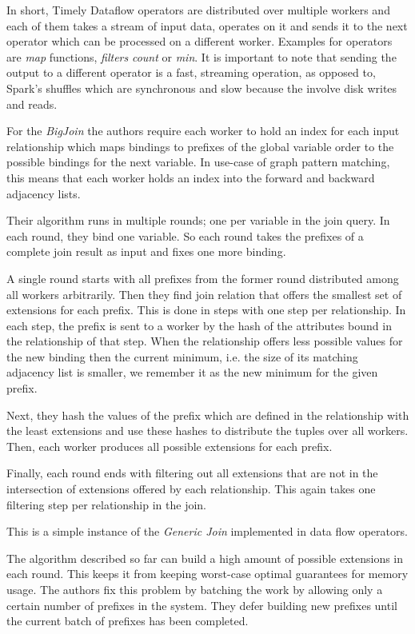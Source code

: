 In short, Timely Dataflow operators are distributed over multiple workers and each of them takes a stream of input data, operates
on it and sends it to the next operator which can be processed on a different worker.
Examples for operators are \textit{map} functions, \textit{filters} \textit{count} or \textit{min}.
It is important to note that sending the output to a different operator is a fast, streaming operation, as opposed to,
Spark's shuffles which are synchronous and slow because the involve disk writes and reads.

For the \textit{BigJoin} the authors require each worker to hold an index for each input relationship which maps bindings to prefixes
of the global variable order to the possible bindings for the next variable.
In use-case of graph pattern matching, this means that each worker holds an index into the forward and backward adjacency lists.

Their algorithm runs in multiple rounds;
one per variable in the join query.
In each round, they bind one variable.
So each round takes the prefixes of a complete join result as input and fixes one more binding.

A single round starts with all prefixes from the former round distributed among all workers arbitrarily.
Then they find join relation that offers the smallest set of extensions for each prefix.
This is done in steps with one step per relationship.
In each step, the prefix is sent to a worker by the hash of the attributes bound in the relationship of that step.
When the relationship offers less possible values for the new binding then the current minimum, i.e. the size of its matching adjacency
list is smaller, we remember it as the new minimum for the given prefix.

Next, they hash the values of the prefix which are defined in the relationship with the least extensions and use these hashes to
distribute the tuples over all workers.
Then, each worker produces all possible extensions for each prefix.

Finally, each round ends with filtering out all extensions that are not in the intersection of extensions offered by each relationship.
This again takes one filtering step per relationship in the join.

This is a simple instance of the \textit{Generic Join} implemented in data flow operators.

The algorithm described so far can build a high amount of possible extensions in each round.
This keeps it from keeping worst-case optimal guarantees for memory usage.
The authors fix this problem by batching the work by allowing only a certain number of prefixes in the system.
They defer building new prefixes until the current batch of prefixes has been completed.


